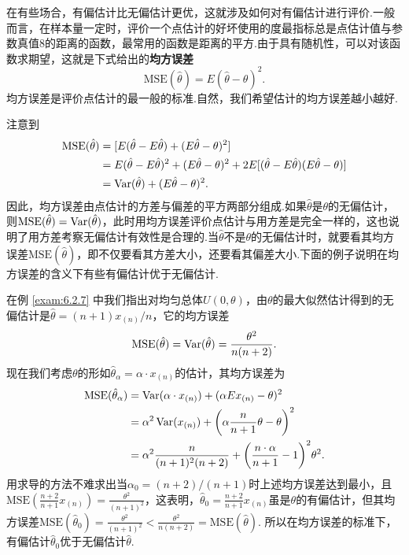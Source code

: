 在有些场合，有偏估计比无偏估计更优，这就涉及如何对有偏估计进行评价.一般而言，在样本量一定时，评价一个点估计的好坏使用的度最指标总是点估计值与参数真值8的距离的函数，最常用的函数是距离的平方.由于具有随机性，可以对该函数求期望，这就是下式给出的\textbf{均方误差}
\begin{equation}\label{eq6.2.6}
  \text{MSE}(\hat\theta) = E(\hat\theta-\theta)^2.
\end{equation}
均方误差是评价点估计的最一般的标准.自然，我们希望估计的均方误差越小越好.

注意到
\begin{align*}
  \text{MSE} (\hat\theta) & = [ E(\hat\theta - E\hat\theta) + (E\hat\theta - \theta)^2 ] \\
  & = E (\hat\theta - E\hat\theta)^2 + (E\hat\theta - \theta)^2 + 2E[(\hat\theta - E\hat\theta)(E\hat\theta-\theta)] \\
  & = \operatorname{Var}(\hat\theta) + (E\hat\theta - \theta)^2.
\end{align*}
因此，均方误差由点估计的方差与偏差的平方两部分组成.如果$\hat\theta$是$\theta$的无偏估计，则$\text{MSE}(\hat\theta)=\operatorname{Var}(\hat\theta)$，此时用均方误差评价点估计与用方差是完全一样的，这也说明了用方差考察无偏估计有效性是合理的.当$\hat\theta$不是$\theta$的无偏估计时，就要看其均方误差$\text{MSE}(\hat\theta)$，即不仅要看其方差大小，还要看其偏差大小.下面的例子说明在均方误差的含义下有些有偏估计优于无偏估计.
\begin{example}\label{exam:6.2.8}
  在例 \ref{exam:6.2.7} 中我们指出对均匀总体$U(0,\theta)$，由$\theta$的最大似然估计得到的无偏估计是$\hat\theta=(n+1)x_{(n)}/n$，它的均方误差
  \[
    \text{MSE}(\hat\theta) = \operatorname{Var}(\hat\theta) = \frac{\theta^2}{n(n+2)}.
  \]
  现在我们考虑$\theta$的形如$\hat\theta_\alpha = \alpha\cdot x_{(n)}$的估计，其均方误差为
  \begin{align*}
    \text{MSE}(\hat\theta_\alpha) & = \Var(\alpha\cdot x_{(n)}) + (\alpha Ex_{(n)} - \theta) ^2 \\
    & = \alpha^2\Var(x_{(n)}) + \left( \alpha\frac n{n+1}\theta - \theta \right)^2 \\
    & = \alpha^2 \frac n{(n+1)^2(n+2)} + \left( \frac{n\cdot \alpha}{n+1} - 1 \right)^2\theta^2 .
  \end{align*}
  用求导的方法不难求出当$\alpha_0=(n+2)/(n+1)$时上述均方误差达到最小，且$\text{MSE}\left(\frac{n+2}{n+1}x_{(n)}\right)=\frac{\theta^2}{(n+1)^2}$，这表明，$\hat\theta_0=\frac{n+2}{n+1}x_{(n)}$虽是$\theta$的有偏估计，但其均方误差$\text{MSE}(\hat\theta_0)=\frac{\theta^2}{(n+1)^2}<\frac{\theta^2}{n(n+2)}=\text{MSE}(\hat\theta)$. 所以在均方误差的标准下，有偏估计$\hat\theta_0$优于无偏估计$\hat\theta$.
\end{example}

